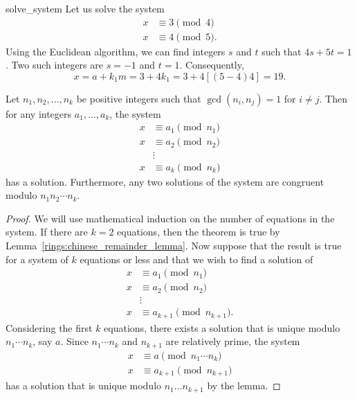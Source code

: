  
\begin{example}{solve_system}
Let us solve the system
\begin{align*}
x & \equiv  3 \pmod{4} \\
x & \equiv  4 \pmod{5}. 
\end{align*}
Using the Euclidean algorithm, we can find integers $s$ and $t$ such
that $4s + 5t =1$. Two such integers are $s = -1$ and $t = 1$.
Consequently,
\[
x = a + k_1 m = 3 + 4k_1 = 3 + 4[(5-4)4] = 19.
\]
\end{example}
 
 
\begin{theorem}
Let $n_1, n_2, \ldots, n_k$ be positive integers such that $\gcd(n_i, n_j)
= 1$ for $i \neq j$. Then for any integers $a_1, \ldots, a_k$, the
system
\begin{align*}
x & \equiv  a_1 \pmod{n_1} \\
x & \equiv  a_2 \pmod{n_2} \\
 &  \vdots  \\
x & \equiv  a_k \pmod{n_k}
\end{align*}
has a solution.  Furthermore, any two solutions of the system are
congruent modulo $n_1 n_2 \cdots n_k$.
\end{theorem}
 
\begin{proof}
We will use mathematical induction on the number of equations in the
system. If there are $k= 2$ equations, then the theorem is true by 
Lemma~\ref{rings:chinese_remainder_lemma}. Now suppose that the result is true for a system of $k$ 
equations or less and that we wish to find a solution of 
\begin{align*}
x & \equiv  a_1 \pmod{n_1} \\
x & \equiv  a_2 \pmod{n_2} \\
  & \vdots  \\
x & \equiv  a_{k+1} \pmod{n_{k+1}}.
\end{align*}
Considering the first $k$ equations, there exists a solution that is
unique modulo $n_1 \cdots n_k$, say $a$. Since $n_1 \cdots n_k$ and
$n_{k+1}$ are relatively prime, the system 
\begin{align*}
x & \equiv  a \pmod{n_1 \cdots n_k } \\
x & \equiv  a_{k+1} \pmod{n_{k+1}}
\end{align*}
has a solution that is unique modulo $n_1 \ldots n_{k+1}$ by the
lemma.
\end{proof}
 
